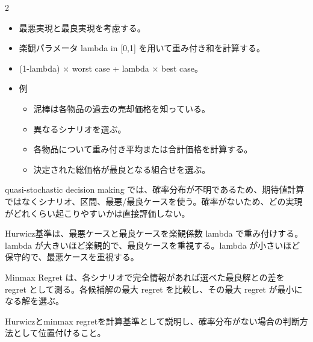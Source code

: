 \clearpage



\vspace{1.5mm}

\begin{multicols}{2}

\footnotesize

\raggedcolumns


\begin{itemize}
\item 最悪実現と最良実現を考慮する。
\item 楽観パラメータ lambda in [0,1] を用いて重み付き和を計算する。
\item (1-lambda) × worst case + lambda × best case。
\item 例
\begin{itemize}
\item 泥棒は各物品の過去の売却価格を知っている。
\item 異なるシナリオを選ぶ。
\item 各物品について重み付き平均または合計価格を計算する。
\item 決定された総価格が最良となる組合せを選ぶ。
\end{itemize}
\end{itemize}

quasi-stochastic decision making では、確率分布が不明であるため、期待値計算ではなくシナリオ、区間、最悪/最良ケースを使う。確率がないため、どの実現がどれくらい起こりやすいかは直接評価しない。\par

Hurwicz基準は、最悪ケースと最良ケースを楽観係数 lambda で重み付けする。lambda が大きいほど楽観的で、最良ケースを重視する。lambda が小さいほど保守的で、最悪ケースを重視する。\par

Minmax Regret は、各シナリオで完全情報があれば選べた最良解との差を regret として測る。各候補解の最大 regret を比較し、その最大 regret が最小になる解を選ぶ。\par

Hurwiczとminmax regretを計算基準として説明し、確率分布がない場合の判断方法として位置付けること。\par


\end{multicols}
